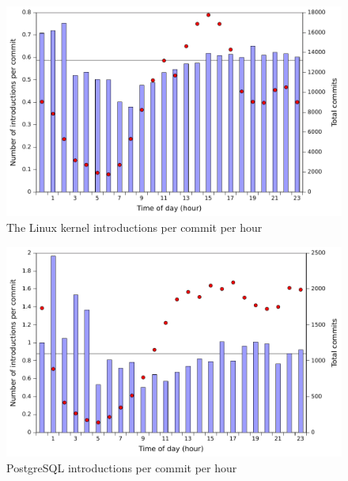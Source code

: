 \begin{figure}
\begin{center}
\includegraphics[width=\columnwidth]{linux-introductions-hour.pdf}
\end{center}
\caption{The Linux kernel introductions per commit per hour}
\label{fig-linux-introductions-hour}
\end{figure}

\begin{figure}
\begin{center}
\includegraphics[width=\columnwidth]{postgresql-introductions-hour.pdf}
\end{center}
\caption{PostgreSQL introductions per commit per hour}
\label{fig-postgresql-introductions-hour}
\end{figure}

